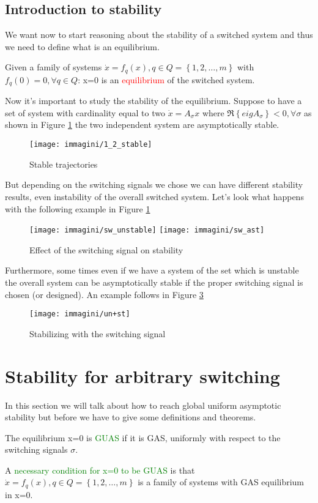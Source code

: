 \subsection{Introduction to stability} \label{introstab}
We want now to start reasoning about the stability of a switched system and thus we need to define what is an equilibrium.
\begin{defn}[Equilibrium]
	Given a family of systems $\dot{x}=f_q(x), q\in Q=\left\{1,2,\dots,m\right\}$ with $f_q(0)=0, \forall q \in Q$: x=0 is an \textcolor{red}{equilibrium} of the switched system.
\end{defn}
Now it's important to study the stability of the equilibrium. Suppose to have a set of system with cardinality equal to two $\dot{x}=A_{\sigma}x$ where $\Re\left\{eigA_{\sigma}\right\}<0, \forall \sigma$ as shown in Figure \ref{fig:12stable} the two independent system are asymptotically stable.
\begin{figure}[H]
	\centering
	\texttt{[image: immagini/1\_2\_stable]}
	\caption{Stable trajectories}
	\label{fig:12stable}
\end{figure}
But depending on the switching signals we chose we can have different stability results, even instability of the overall switched system. Let's look what happens with the following example in Figure \ref{fig:12stable}
\begin{figure}[H]
	\centering
	\texttt{[image: immagini/sw\_unstable]}
	\texttt{[image: immagini/sw\_ast]}
	\caption{Effect of the switching signal on stability}
	\label{fig:swunstable}
\end{figure}
Furthermore, some times even if we have a system of the set which is unstable the overall system can be asymptotically stable if the proper switching signal is chosen (or designed). An example follows in Figure \ref{fig:unst}
\begin{figure}[H]
	\centering
	\texttt{[image: immagini/un+st]}
	\caption{Stabilizing with the switching signal}
	\label{fig:unst}
\end{figure}
\section{Stability for arbitrary switching}\label{stab-arb-sw}
In this section we will talk about how to reach global uniform asymptotic stability but before we have to give some definitions and theorems.

\begin{defn}
	The equilibrium x=0 is \textcolor{green}{GUAS} if it is GAS, uniformly with respect to the switching signals $\sigma$.
\end{defn}
A \textcolor{green}{necessary condition for x=0 to be GUAS} is that $\dot{x}=f_q(x), q\in Q=\left\{1,2,\dots,m\right\}$ is a family of systems with GAS equilibrium in x=0.

